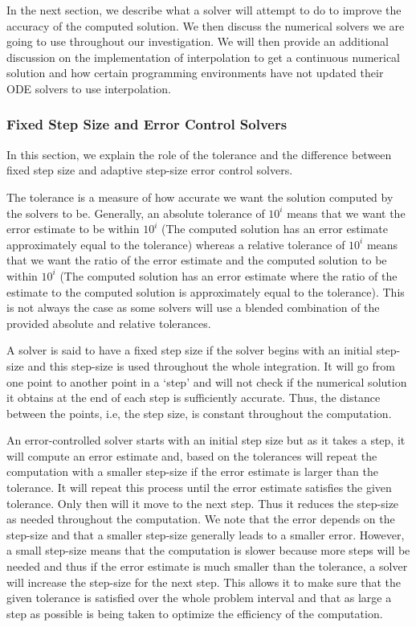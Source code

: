 In the next section, we describe what a solver will attempt to do to improve the accuracy of the computed solution. We then discuss the numerical solvers we are going to use throughout our investigation. We will then provide an additional discussion on the implementation of interpolation to get a continuous numerical solution and how certain programming environments have not updated their ODE solvers to use interpolation.

\subsubsection{Fixed Step Size and Error Control Solvers}
\label{subsection:fixed_vs_control}
In this section, we explain the role of the tolerance and the difference between fixed step size and adaptive step-size error control solvers.

The tolerance is a measure of how accurate we want the solution computed by the solvers to be. Generally, an absolute tolerance of $10^{i}$ means that we want the error estimate to be within $10^{i}$ (The computed solution has an error estimate approximately equal to the tolerance) whereas a relative tolerance of $10^{i}$ means that we want the ratio of the error estimate and the computed solution to be within $10^{i}$ (The computed solution has an error estimate where the ratio of the estimate to the computed solution is approximately equal to the tolerance). This is not always the case as some solvers will use a blended combination of the provided absolute and relative tolerances.

A solver is said to have a fixed step size if the solver begins with an initial step-size and this step-size is used throughout the whole integration. It will go from one point to another point in a `step' and will not check if the numerical solution it obtains at the end of each step is sufficiently accurate. Thus, the distance between the points, i.e, the step size, is constant throughout the computation.

An error-controlled solver starts with an initial step size but as it takes a step, it will compute an error estimate and, based on the tolerances will repeat the computation with a smaller step-size if the error estimate is larger than the tolerance. It will repeat this process until the error estimate satisfies the given tolerance. Only then will it move to the next step. Thus it reduces the step-size as needed throughout the computation. We note that the error depends on the step-size and that a smaller step-size generally leads to a smaller error. However, a small step-size means that the computation is slower because more steps will be needed and thus if the error estimate is much smaller than the tolerance, a solver will increase the step-size for the next step. This allows it to make sure that the given tolerance is satisfied over the whole problem interval and that as large a step as possible is being taken to optimize the efficiency of the computation.

